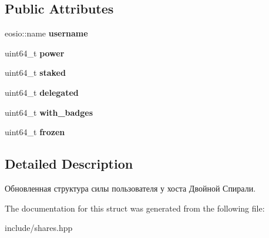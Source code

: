 \subsection*{Public Attributes}
\begin{DoxyCompactItemize}
\item 
\mbox{\label{structpower3_a1a62921d753598e4bc97e1f900e57da7}} 
eosio\+::name {\bfseries username}
\item 
\mbox{\label{structpower3_a6b7f01357d49db2faaa4ec39783e6dda}} 
uint64\+\_\+t {\bfseries power}
\item 
\mbox{\label{structpower3_a2787d6a09d20a84b2874bfe9a5c18228}} 
uint64\+\_\+t {\bfseries staked}
\item 
\mbox{\label{structpower3_a99f2d6242441cc47bb42c06f7899d47f}} 
uint64\+\_\+t {\bfseries delegated}
\item 
\mbox{\label{structpower3_ae6d8dfc19ca72b4578bc19ce64e008ec}} 
uint64\+\_\+t {\bfseries with\+\_\+badges}
\item 
\mbox{\label{structpower3_a85e7e94bb9405f2d65665a6c2e584329}} 
uint64\+\_\+t {\bfseries frozen}
\end{DoxyCompactItemize}


\subsection{Detailed Description}
Обновленная структура силы пользователя у хоста Двойной Спирали. 

The documentation for this struct was generated from the following file\+:\begin{DoxyCompactItemize}
\item 
include/shares.\+hpp\end{DoxyCompactItemize}
